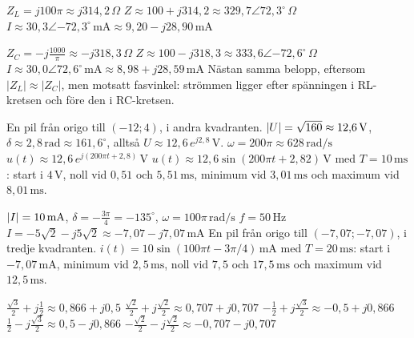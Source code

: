 
\begin{facit}

  $Z_L = j100\pi \approx j314{,}2\,\Omega$
 $Z \approx 100 + j314{,}2 \approx 329{,}7\angle 72{,}3^{\circ}\,\Omega$
 $I \approx 30{,}3\angle{-72{,}3^{\circ}}\,\text{mA} \approx 9{,}20 - j28{,}90\,\text{mA}$

  $Z_C = -j\frac{1000}{\pi} \approx -j318{,}3\,\Omega$
 $Z \approx 100 - j318{,}3 \approx 333{,}6\angle{-72{,}6^{\circ}}\,\Omega$
 $I \approx 30{,}0\angle 72{,}6^{\circ}\,\text{mA} \approx 8{,}98 + j28{,}59\,\text{mA}$
 Nästan samma belopp, eftersom $|Z_L| \approx |Z_C|$, men motsatt fasvinkel: strömmen ligger
efter spänningen i RL-kretsen och före den i RC-kretsen.

  En pil från origo till $(-12; 4)$, i andra kvadranten.
 $\lvert U\rvert = \sqrt{160} \approx 12{,}6\,\text{V}$, $\delta \approx 2{,}8\,\text{rad} \approx
161{,}6^{\circ}$, alltså $U \approx 12{,}6\,e^{j2{,}8}\,\text{V}$.
 $\omega = 200\pi \approx 628\,\text{rad/s}$
 $u(t) \approx 12{,}6\,e^{j(200\pi t + 2{,}8)}\,\text{V}$
 $u(t) \approx 12{,}6\sin(200\pi t + 2{,}82)\,\text{V}$ med $T = 10\,\text{ms}$: start i $4\,\text{V}$,
noll vid $0{,}51$ och $5{,}51\,\text{ms}$, minimum vid $3{,}01\,\text{ms}$ och maximum vid $8{,}01\,\text{ms}$.

  $\lvert I\rvert = 10\,\text{mA}$, $\delta = -\frac{3\pi}{4} = -135^{\circ}$,
$\omega = 100\pi\,\text{rad/s}$
 $f = 50\,\text{Hz}$
 $I = -5\sqrt{2} - j5\sqrt{2} \approx -7{,}07 - j7{,}07\,\text{mA}$
 En pil från origo till $(-7{,}07; -7{,}07)$, i tredje kvadranten.
 $i(t) = 10\sin(100\pi t - 3\pi/4)\,\text{mA}$ med $T = 20\,\text{ms}$: start i
$-7{,}07\,\text{mA}$, minimum vid $2{,}5\,\text{ms}$, noll vid $7{,}5$ och $17{,}5\,\text{ms}$ och maximum vid
$12{,}5\,\text{ms}$.

  $\frac{\sqrt{3}}{2} + j\frac{1}{2} \approx 0{,}866 + j0{,}5$
 $\frac{\sqrt{2}}{2} + j\frac{\sqrt{2}}{2} \approx 0{,}707 + j0{,}707$
 $-\frac{1}{2} + j\frac{\sqrt{3}}{2} \approx -0{,}5 + j0{,}866$
 $\frac{1}{2} - j\frac{\sqrt{3}}{2} \approx 0{,}5 - j0{,}866$
 $-\frac{\sqrt{2}}{2} - j\frac{\sqrt{2}}{2} \approx -0{,}707 - j0{,}707$


\end{facit}
